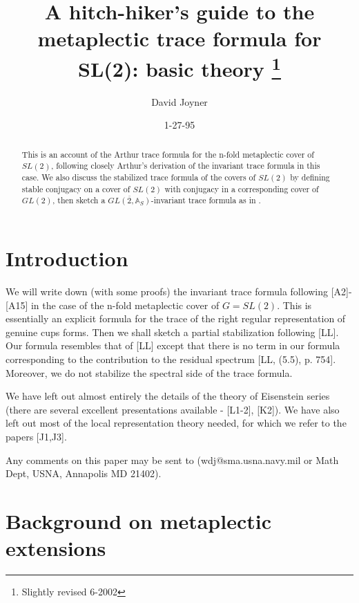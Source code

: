 \documentclass[12pt]{article}
\def\aaa{\mathbb{A}}
\begin{document}
\author{David Joyner}
\title{A hitch-hiker's guide to the
metaplectic trace formula for SL(2): basic theory
\thanks{Slightly revised 6-2002}}
\date{1-27-95}
\maketitle

\begin{abstract}
This is an account of the Arthur trace formula for the
n-fold metaplectic cover of $SL(2)$, following closely
Arthur's derivation of the invariant trace formula in this case.
We also discuss the stabilized trace formula of
the covers of $SL(2)$ by defining
stable conjugacy on a cover of $SL(2)$ with conjugacy
in a corresponding cover of $GL(2)$,
then sketch a $\overline{GL(2,\aaa _S)}$-invariant
trace formula as in \cite{LL}.
\end{abstract}

\tableofcontents

\section{Introduction}

We will write down (with some proofs) the invariant trace
formula following [A2]-[A15] in the case of the
n-fold metaplectic cover of $G=SL(2)$.
This is essentially an explicit formula for the trace of
the right regular representation of
genuine cups forms.
Then we shall sketch a partial stabilization following [LL].
Our formula resembles that of [LL] except that there
is no term in our formula corresponding to the
contribution to the residual spectrum
[LL, (5.5), p. 754]. Moreover, we do not stabilize the spectral
side of the trace formula.

We have left out almost entirely the details of the theory of
Eisenstein
series (there are several excellent presentations available -
[L1-2], [K2]). We have also left out most of the
local representation theory needed, for which we refer to the
papers [J1,J3].

Any comments on this paper may be sent to
(wdj@sma.usna.navy.mil or Math Dept, USNA, Annapolis MD 21402).

\section{Background on metaplectic extensions}
\end{document}

